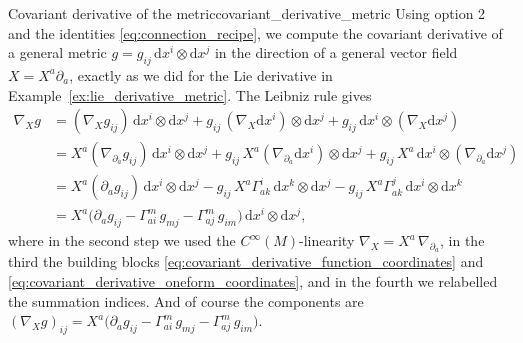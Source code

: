 \begin{colexample}{Covariant derivative of the metric}{covariant_derivative_metric}
    Using option 2 and the identities \eqref{eq:connection_recipe}, we compute the covariant derivative of a general metric $g = g_{ij}\,\mathrm{d}x^i \otimes \mathrm{d}x^j$ in the direction of a general vector field $X = X^a \partial_a$, exactly as we did for the Lie derivative in Example~\ref{ex:lie_derivative_metric}. The Leibniz rule gives
    \begin{align*}
    \nabla_{X} g
    &= (\nabla_{X} g_{ij})\,\mathrm{d}x^i\otimes \mathrm{d}x^j
     + g_{ij}\,(\nabla_{X} \mathrm{d}x^i)\otimes \mathrm{d}x^j
     + g_{ij}\,\mathrm{d}x^i\otimes(\nabla_{X} \mathrm{d}x^j) \\
    &= X^a(\nabla_{\partial_a} g_{ij})\,\mathrm{d}x^i\otimes \mathrm{d}x^j
     + g_{ij}\,X^a(\nabla_{\partial_a} \mathrm{d}x^i)\otimes \mathrm{d}x^j
     + g_{ij}\,X^a\,\mathrm{d}x^i\otimes(\nabla_{\partial_a} \mathrm{d}x^j) \\
    &= X^a(\partial_a g_{ij})\,\mathrm{d}x^i\otimes \mathrm{d}x^j
     - g_{ij}\,X^a\Gamma^i_{ak}\,\mathrm{d}x^k\otimes \mathrm{d}x^j
     - g_{ij}\,X^a\Gamma^j_{ak}\,\mathrm{d}x^i\otimes \mathrm{d}x^k \\
    &= X^a\big(\partial_a g_{ij} - \Gamma^m_{ai}\,g_{mj} - \Gamma^m_{aj}\,g_{im}\big)\,\mathrm{d}x^i\otimes \mathrm{d}x^j ,
    \end{align*}
    where in the second step we used the $C^\infty(M)$-linearity $\nabla_X = X^a\,\nabla_{\partial_a}$, in the third the building blocks \eqref{eq:covariant_derivative_function_coordinates} and \eqref{eq:covariant_derivative_oneform_coordinates}, and in the fourth we relabelled the summation indices. And of course the components are $(\nabla_{X} g)_{ij} = X^a\big(\partial_a g_{ij} - \Gamma^m_{ai}\,g_{mj} - \Gamma^m_{aj}\,g_{im}\big)$.
\end{colexample}






